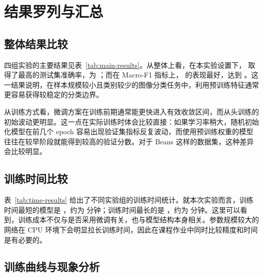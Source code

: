 \section{结果罗列与汇总}

\subsection{整体结果比较}

四组实验的主要结果见表~\ref{tab:main-results}。从整体上看，在本实验设置下，\BestAccModel{} 取得了最高的测试集准确率，为 \BestAccValue{}；而在 Macro-F1 指标上，\BestFOneModel{} 的表现最好，达到 \BestFOneValue{}。这一结果说明，在样本规模较小且类别较少的图像分类任务中，利用预训练特征通常更容易获得较稳定的分类边界。

\begin{table}[t]
    \caption{四组实验的测试集结果对比}
    \label{tab:main-results}
    \centering
    \resizebox{\columnwidth}{!}{}
\end{table}

从训练方式看，微调方案在训练前期通常能更快进入有效收敛区间，而从头训练的初始波动更明显。这一点在实际训练时体会比较直接：如果学习率稍大，随机初始化模型在前几个 epoch 容易出现验证集指标反复波动，而使用预训练权重的模型往往在较早阶段就能得到较高的验证分数。对于 Beans 这样的数据集，这种差异会比较明显。

\subsection{训练时间比较}

表~\ref{tab:time-results} 给出了不同实验组的训练时间统计。就本次实验而言，训练时间最短的模型是 \FastestModel{}，约为 \FastestTime{} 分钟；训练时间最长的是 \SlowestModel{}，约为 \SlowestTime{} 分钟。这里可以看到，训练成本不仅与是否采用微调有关，也与模型结构本身相关。参数规模较大的网络在 CPU 环境下会明显拉长训练时间，因此在课程作业中同时比较精度和时间是有必要的。

\begin{table}[t]
    \caption{四组实验的训练时间统计}
    \label{tab:time-results}
    \centering
    \resizebox{\columnwidth}{!}{}
\end{table}

\subsection{训练曲线与现象分析}


